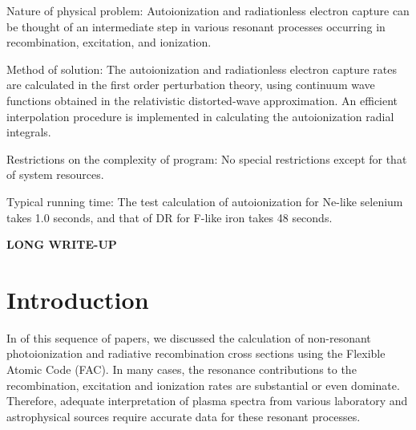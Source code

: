\documentclass{elsart}
\begin{document}
Nature of physical problem: Autoionization and radiationless electron capture
can be thought of an intermediate step in various resonant processes occurring
in recombination, excitation, and ionization.  

Method of solution: The autoionization and radiationless electron capture
rates are calculated in the first order perturbation theory, using continuum
wave functions obtained in the relativistic distorted-wave approximation. An
efficient interpolation procedure is implemented in calculating the
autoionization radial integrals.

Restrictions on the complexity of program: No special restrictions except for
that of system resources. 

Typical running time: The test calculation of autoionization for Ne-like
selenium takes 1.0 seconds, and that of DR for F-like iron takes 48 seconds.

\textbf{\large LONG WRITE-UP}

\section{Introduction}
In  \citep{gu01c} of this sequence of papers, we discussed
the calculation of non-resonant photoionization and radiative recombination
cross sections
using the Flexible Atomic Code (FAC). In many cases, the resonance
contributions to the recombination, excitation and ionization rates are
substantial or even dominate. Therefore, adequate interpretation of plasma
spectra from various laboratory and astrophysical sources require accurate
data for these resonant processes. 
\end{document}
